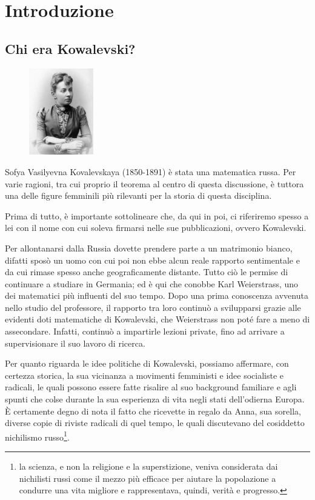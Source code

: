 \chapter{Introduzione}

\section{Chi era Kowalevski?}
\begin{figure}
    \centering
    \includegraphics[width=0.25\textwidth]{kovalevskaya_8}
\end{figure}

Sofya Vasilyevna Kovalevskaya (1850-1891) è stata una matematica russa. Per varie ragioni, tra cui proprio il teorema al centro di questa discussione, è tuttora una delle figure femminili più rilevanti per la storia di questa disciplina.

Prima di tutto, è importante sottolineare che, da qui in poi, ci riferiremo spesso a lei con il nome con cui soleva firmarsi nelle sue pubblicazioni, ovvero Kowalevski.

Per allontanarsi dalla Russia dovette prendere parte a un matrimonio bianco, difatti sposò un uomo con cui poi non ebbe alcun reale rapporto sentimentale e da cui rimase spesso anche geograficamente distante.
Tutto ciò le permise di continuare a studiare in Germania; ed è qui che conobbe Karl Weierstrass, uno dei matematici più influenti del suo tempo.
Dopo una prima conoscenza avvenuta nello studio del professore, il rapporto tra loro continuò a svilupparsi grazie alle evidenti doti matematiche di Kowalevski, che Weierstrass non poté fare a meno di assecondare. Infatti, continuò a impartirle lezioni private, fino ad arrivare a supervisionare il suo lavoro di ricerca.

Per quanto riguarda le idee politiche di Kowalevski, possiamo affermare, con certezza storica, la sua vicinanza a movimenti femministi e idee socialiste e radicali, le quali possono essere fatte risalire al suo background familiare e agli spunti che colse durante la sua esperienza di vita negli stati dell'odierna Europa. È certamente degno di nota il fatto che ricevette in regalo da Anna, sua sorella, diverse copie di riviste radicali di quel tempo, le quali discutevano del cosiddetto nichilismo russo\footnote{la scienza, e non la religione e la superstizione, veniva considerata dai nichilisti russi come il mezzo più efficace per aiutare la popolazione a condurre una vita migliore e rappresentava, quindi, verità e progresso.}.

